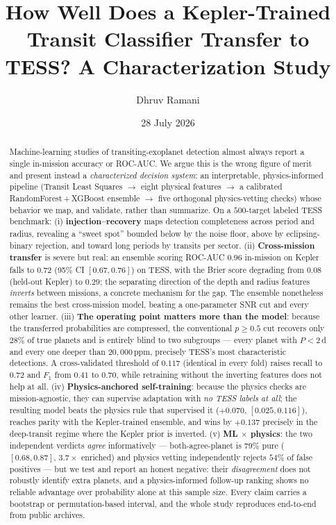 \documentclass[11pt]{article}
\title{\textbf{How Well Does a Kepler-Trained Transit Classifier Transfer to
TESS? A Characterization Study}}
\author{Dhruv Ramani}
\date{28 July 2026}
\begin{document}
\maketitle

\begin{abstract}
\noindent
Machine-learning studies of transiting-exoplanet detection almost always report
a single in-mission accuracy or ROC-AUC. We argue this is the wrong figure of
merit and present instead a \emph{characterized decision system}: an
interpretable, physics-informed pipeline (Transit Least Squares $\rightarrow$
eight physical features $\rightarrow$ a calibrated RandomForest\,+\,XGBoost
ensemble $\rightarrow$ five orthogonal physics-vetting checks) whose behavior we
map, and validate, rather than summarize. On a $500$-target labeled TESS
benchmark: (i) \textbf{injection--recovery} maps detection completeness across
period and radius, revealing a ``sweet spot'' bounded below by the noise floor,
above by eclipsing-binary rejection, and toward long periods by transits per
sector. (ii) \textbf{Cross-mission transfer} is severe but real: an ensemble
scoring ROC-AUC $0.96$ in-mission on Kepler falls to $0.72$ (95\% CI
$[0.67,0.76]$) on TESS, with the Brier score degrading from $0.08$ (held-out
Kepler) to $0.29$; the
separating direction of the depth and radius features \emph{inverts} between
missions, a concrete mechanism for the gap. The ensemble nonetheless remains the
best cross-mission model, beating a one-parameter SNR cut and every other learner.
(iii) \textbf{The operating point matters more than the model}: because the
transferred probabilities are compressed, the conventional $p\geq0.5$ cut recovers
only $28\%$ of true planets and is entirely blind to two subgroups --- every
planet with $P<2$\,d and every one deeper than $20{,}000$\,ppm, precisely TESS's
most characteristic detections. A cross-validated threshold of $0.117$ (identical
in every fold) raises recall to $0.72$ and $F_1$ from $0.41$ to $0.70$, while
retraining without the inverting features does not help at all. (iv)
\textbf{Physics-anchored self-training}: because the physics checks are
mission-agnostic, they can supervise adaptation with \emph{no TESS labels at
all}; the resulting model beats the physics rule that supervised it
($+0.070$, $[0.025,0.116]$), reaches parity with the Kepler-trained ensemble, and
wins by $+0.137$ precisely in the deep-transit regime where the Kepler prior is
inverted. (v) \textbf{ML $\times$ physics}: the two independent verdicts \emph{agree}
informatively --- both-agree-planet is $79\%$ pure ($[0.68,0.87]$, $3.7\times$
enriched) and physics vetting independently rejects $54\%$ of false positives ---
but we test and report an honest negative: their \emph{disagreement} does not
robustly identify extra planets, and a physics-informed follow-up ranking shows no
reliable advantage over probability alone at this sample size. Every claim carries
a bootstrap or permutation-based interval, and the whole study reproduces
end-to-end from public archives.
\end{abstract}
\end{document}
